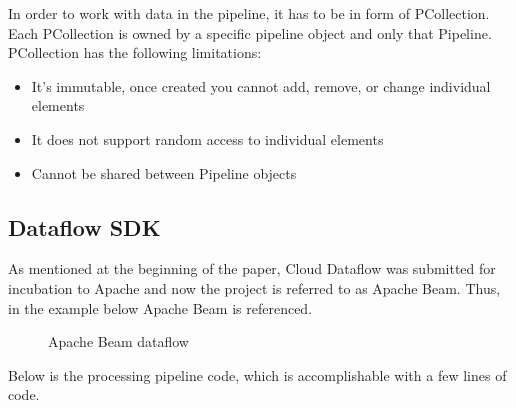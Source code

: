 \documentclass[9pt,twocolumn,twoside]{../../styles/osajnl}
\begin{document}
In order to work with data in the pipeline, it has to be in form of
PCollection. Each PCollection is owned by a specific pipeline object
and only that Pipeline. PCollection has the following limitations:

\begin{itemize}
  \renewcommand{\labelitemi}{\scriptsize$\square$}
  
\item It’s immutable, once created you cannot add, remove, or change
  individual elements
\item It does not support random access to individual elements
\item Cannot be shared between Pipeline objects

\end{itemize}

\subsection{Dataflow SDK}

As mentioned at the beginning of the paper, Cloud Dataflow was
submitted for incubation to Apache and now the project is referred to
as Apache Beam. Thus, in the example below Apache Beam is referenced.

\begin{figure}[htbp]
\centering {}
\caption{Apache Beam dataflow \cite{www-wordcountflow}}
\label{fig:false-color}
\end{figure}

Below is the processing pipeline code, which is accomplishable with a
few lines of code.
\end{document}
